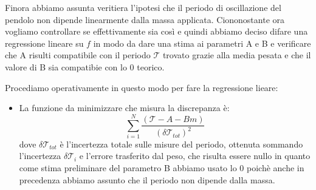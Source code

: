 Finora abbiamo assunta veritiera l'ipotesi che il periodo di oscillazione del pendolo non dipende linearmente dalla massa applicata. Ciononostante ora vogliamo controllare se effettivamente sia così e quindi abbiamo deciso difare una regressione lineare su $f$ in modo da dare una stima ai parametri A e B e verificare che A risulti compatibile con il periodo $\mathcal{T}$ trovato grazie alla media pesata e che il valore di B sia compatibie con lo 0 teorico.

Procediamo operativamente in questo modo per fare la regressione lieare:

\begin{itemize}
	\item{La funzione da minimizzare che misura la discrepanza è:
			\begin{equation}
                \sum_{i=1}^{N} \frac{(\mathcal{T} - A - B m)}{(\delta \mathcal{T}_{tot})^2}	
                \label{eq:min_quad}
			\end{equation}
            dove $\delta \mathcal{T}_{tot}$ è l'incertezza totale sulle misure del periodo, ottenuta sommando l'incertezza $\delta \mathcal{T}_i$ e l'errore trasferito dal peso, che risulta essere nullo in quanto come stima preliminare del parametro B abbiamo usato lo 0 poichè anche in precedenza abbiamo assunto che il periodo non dipende dalla massa.}
\end{itemize}
